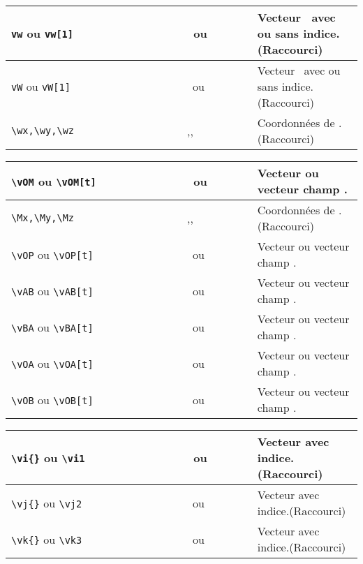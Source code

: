 \documentclass[a4paper,10pt]{article}
\newcommand{\rac}{({\color{red}Raccourci})}
\begin{document}
	\begin{tabular}{|p{0.5\linewidth}|p{0.2\linewidth}|p{0.3\linewidth}|}
		\hline
			\verb!vw! ou 	\verb!vw[1]!	&	\vw\ ou \vw[1]	&	Vecteur \vw\ avec ou sans indice. \rac
		\\\hline
			\verb!vW! ou 	\verb!vW[1]!	&	\vW\ ou \vW[1]	&	Vecteur \vW\ avec ou sans indice. \rac
		\\\hline
			\verb!\wx,\wy,\wz! 		&	\wx,\wy,\wz	&	Coordonnées de \vw. \rac
		\\\hline
	\end{tabular}
	\begin{tabular}{|p{0.5\linewidth}|p{0.2\linewidth}|p{0.3\linewidth}|}
		\hline
			\verb!\vOM! ou  \verb!\vOM[t]!	&	\vOM\ ou  \vOM[t]	&	Vecteur ou vecteur champ \vOM.
		\\\hline
			\verb!\Mx,\My,\Mz!		&	\Mx,\My,\Mz	&	Coordonnées de \vOM.\rac
		\\\hline
			\verb!\vOP! ou 	\verb!\vOP[t]!	&	\vOP\ ou  \vOP[t]	&	Vecteur ou vecteur champ \vOP.
		\\\hline
			\verb!\vAB! ou 	\verb!\vAB[t]!	&	\vAB\ ou  \vAB[t]	&	Vecteur ou vecteur champ \vAB.
		\\\hline
			\verb!\vBA! ou 	\verb!\vBA[t]!	&	\vBA\ ou  \vBA[t]	&	Vecteur ou vecteur champ \vBA.
		\\\hline
			\verb!\vOA! ou 	\verb!\vOA[t]!	&	\vOA\ ou  \vOA[t]	&	Vecteur ou vecteur champ \vOA.
		\\\hline
			\verb!\vOB! ou 	\verb!\vOB[t]!	&	\vOB\ ou  \vOB[t]	&	Vecteur ou vecteur champ \vOB.
		\\\hline
	\end{tabular}
	\begin{tabular}{|p{0.5\linewidth}|p{0.2\linewidth}|p{0.3\linewidth}|}
		\hline
			\verb!\vi{}! ou \verb!\vi1!	&	\vi\ ou  \vi1		&	Vecteur \vi{} avec indice.\rac
		\\\hline
			\verb!\vj{}! ou \verb!\vj2!	&	\vj\ ou  \vj2		&	Vecteur \vj{} avec indice.\rac
		\\\hline
			\verb!\vk{}! ou \verb!\vk3!	&	\vk\ ou  \vk3		&	Vecteur \vk{} avec indice.\rac
		\\\hline
	\end{tabular}
\end{document}
